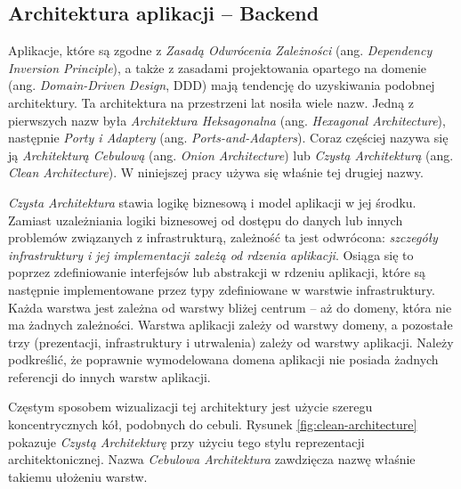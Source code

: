 \documentclass[12pt]{article}
\numberwithin{figure}{section}
\begin{document}
\begin{sloppypar}
\subsection{Architektura aplikacji -- Backend}
    
Aplikacje, które są zgodne z \textit{Zasadą Odwrócenia Zależności} (ang. \textit{Dependency Inversion Principle}), a także z zasadami projektowania opartego na domenie (ang. \textit{Domain-Driven Design}, DDD) mają tendencję do uzyskiwania podobnej architektury. Ta architektura na przestrzeni lat nosiła wiele nazw. Jedną z pierwszych nazw była \textit{Architektura Heksagonalna} (ang. \textit{Hexagonal Architecture}), następnie \textit{Porty i Adaptery} (ang. \textit{Ports-and-Adapters}). Coraz częściej nazywa się ją \textit{Architekturą Cebulową} (ang. \textit{Onion Architecture}) lub \textit{Czystą Architekturą} (ang. \textit{Clean Architecture}). W niniejszej pracy używa się właśnie tej drugiej nazwy.

\textit{Czysta Architektura} stawia logikę biznesową i model aplikacji w jej środku. Zamiast uzależniania logiki biznesowej od dostępu do danych lub innych problemów związanych z infrastrukturą, zależność ta jest odwrócona: \textit{szczegóły infrastruktury i jej implementacji zależą od rdzenia aplikacji}. Osiąga się to poprzez zdefiniowanie interfejsów lub abstrakcji w rdzeniu aplikacji, które są następnie implementowane przez typy zdefiniowane w warstwie infrastruktury. Każda warstwa jest zależna od warstwy bliżej centrum -- aż do domeny, która nie ma żadnych zależności. Warstwa aplikacji zależy od warstwy domeny, a pozostałe trzy (prezentacji, infrastruktury i utrwalenia) zależy od warstwy aplikacji. Należy podkreślić, że poprawnie wymodelowana domena aplikacji nie posiada żadnych referencji do innych warstw aplikacji.
    
Częstym sposobem wizualizacji tej architektury jest użycie szeregu koncentrycznych kół, podobnych do cebuli. Rysunek \ref{fig:clean-architecture} pokazuje \textit{Czystą Architekturę} przy użyciu tego stylu reprezentacji architektonicznej. Nazwa \textit{Cebulowa Architektura} zawdzięcza nazwę właśnie takiemu ułożeniu warstw.
    

\end{sloppypar}
\end{document}
